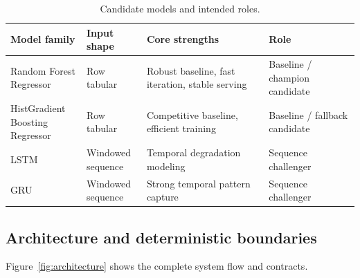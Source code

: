 \documentclass[11pt]{article}
\begin{document}
\begin{table}[H]
\centering
\caption{Candidate models and intended roles.}
\label{tab:model_matrix}
\begin{tabular}{p{3.6cm} p{3.0cm} p{5.2cm} p{3.6cm}}
\toprule
\textbf{Model family} & \textbf{Input shape} & \textbf{Core strengths} & \textbf{Role} \\
\midrule

\makecell[l]{Random Forest\\Regressor} &
Row tabular &
Robust baseline, fast iteration, stable serving &
Baseline / champion candidate \\

\makecell[l]{HistGradient\\Boosting Regressor} &
Row tabular &
Competitive baseline, efficient training &
Baseline / fallback candidate \\

LSTM &
\makecell[l]{Windowed\\sequence} &
Temporal degradation modeling &
Sequence challenger \\

GRU &
\makecell[l]{Windowed\\sequence} &
Strong temporal pattern capture &
Sequence challenger \\

\bottomrule
\end{tabular}
\end{table}

\subsection{Architecture and deterministic boundaries}
Figure~\ref{fig:architecture} shows the complete system flow and contracts.



\end{document}
